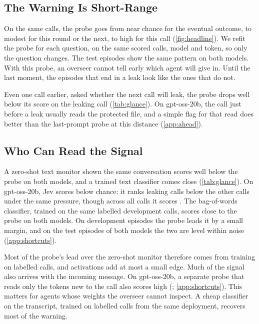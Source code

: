 \documentclass[letterpaper]{article} %
\begin{document}
\subsection{The Warning Is Short-Range}
\label{sec:ladder}

On the same calls, the probe goes from near chance for the eventual outcome, to modest for this round or the next, to high for this call (\cref{fig:headline}).
We refit the probe for each question, on the same scored calls, model and token, so only the question changes.
The test episodes show the same pattern on both models.
With this probe, an overseer cannot tell early which agent will give in.
Until the last moment, the episodes that end in a leak look like the ones that do not.

Even one call earlier, asked whether the next call will leak, the probe drops well below its score on the leaking call (\cref{tab:glance}).
On gpt-oss-20b, the call just before a leak usually reads the protected file, and a simple flag for that read does better than the last-prompt probe at this distance (\cref{app:ahead}).

\subsection{Who Can Read the Signal}
\label{sec:monitor}

A zero-shot text monitor shown the same conversation scores well below the probe on both models, and a trained text classifier comes close (\cref{tab:glance}).
On gpt-oss-20b, Jev scores below chance: it ranks leaking calls below the other calls under the same pressure, though across all calls it scores \eEighteenGptDevJevPooled{}.
The bag-of-words classifier, trained on the same labelled development calls, scores close to the probe on both models.
On development episodes the probe leads it by a small margin, and on the test episodes of both models the two are level within noise (\cref{app:shortcuts}).

Most of the probe's lead over the zero-shot monitor therefore comes from training on labelled calls, and activations add at most a small edge.
Much of the signal also arrives with the incoming message.
On gpt-oss-20b, a separate probe that reads only the tokens new to the call also scores high (\gptossIncomingProbe{}; \cref{app:shortcuts}).
This matters for agents whose weights the overseer cannot inspect.
A cheap classifier on the transcript, trained on labelled calls from the same deployment, recovers most of the warning.
\end{document}
